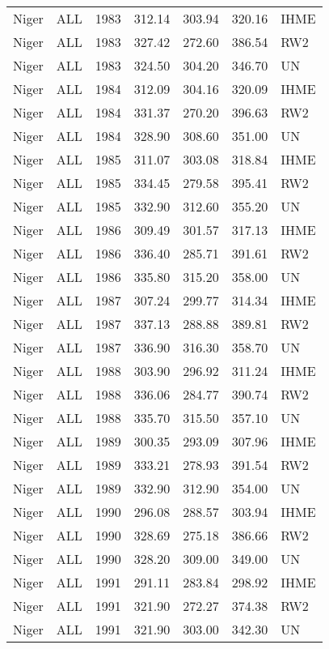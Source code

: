 \begin{longtable}{lllrrrl}
  Niger & ALL & 1983 & 312.14 & 303.94 & 320.16 & IHME \\ 
  Niger & ALL & 1983 & 327.42 & 272.60 & 386.54 & RW2 \\ 
  Niger & ALL & 1983 & 324.50 & 304.20 & 346.70 & UN \\ 
  Niger & ALL & 1984 & 312.09 & 304.16 & 320.09 & IHME \\ 
  Niger & ALL & 1984 & 331.37 & 270.20 & 396.63 & RW2 \\ 
  Niger & ALL & 1984 & 328.90 & 308.60 & 351.00 & UN \\ 
  Niger & ALL & 1985 & 311.07 & 303.08 & 318.84 & IHME \\ 
  Niger & ALL & 1985 & 334.45 & 279.58 & 395.41 & RW2 \\ 
  Niger & ALL & 1985 & 332.90 & 312.60 & 355.20 & UN \\ 
  Niger & ALL & 1986 & 309.49 & 301.57 & 317.13 & IHME \\ 
  Niger & ALL & 1986 & 336.40 & 285.71 & 391.61 & RW2 \\ 
  Niger & ALL & 1986 & 335.80 & 315.20 & 358.00 & UN \\ 
  Niger & ALL & 1987 & 307.24 & 299.77 & 314.34 & IHME \\ 
  Niger & ALL & 1987 & 337.13 & 288.88 & 389.81 & RW2 \\ 
  Niger & ALL & 1987 & 336.90 & 316.30 & 358.70 & UN \\ 
  Niger & ALL & 1988 & 303.90 & 296.92 & 311.24 & IHME \\ 
  Niger & ALL & 1988 & 336.06 & 284.77 & 390.74 & RW2 \\ 
  Niger & ALL & 1988 & 335.70 & 315.50 & 357.10 & UN \\ 
  Niger & ALL & 1989 & 300.35 & 293.09 & 307.96 & IHME \\ 
  Niger & ALL & 1989 & 333.21 & 278.93 & 391.54 & RW2 \\ 
  Niger & ALL & 1989 & 332.90 & 312.90 & 354.00 & UN \\ 
  Niger & ALL & 1990 & 296.08 & 288.57 & 303.94 & IHME \\ 
  Niger & ALL & 1990 & 328.69 & 275.18 & 386.66 & RW2 \\ 
  Niger & ALL & 1990 & 328.20 & 309.00 & 349.00 & UN \\ 
  Niger & ALL & 1991 & 291.11 & 283.84 & 298.92 & IHME \\ 
  Niger & ALL & 1991 & 321.90 & 272.27 & 374.38 & RW2 \\ 
  Niger & ALL & 1991 & 321.90 & 303.00 & 342.30 & UN \\ 

\end{longtable}
